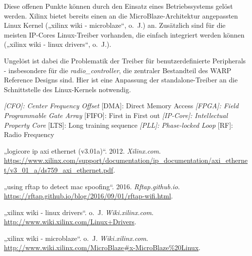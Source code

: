 \documentclass[ngerman,]{scrartcl}
\begin{document}
Diese offenen Punkte können durch den Einsatz eines Betriebssystems
gelöst werden. Xilinx bietet bereits einen an die MicroBlaze-Architektur
angepassten Linux Kernel („xilinx wiki - microblaze``, o.~J.) an.
Zusätzlich sind für die meisten IP-Cores Linux-Treiber vorhanden, die
einfach integriert werden können („xilinx wiki - linux drivers``,
o.~J.).

Ungelöst ist dabei die Problematik der Treiber für benutzerdefinierte
Peripherals - insbesondere für die \emph{radio\_controller}, die
zentraler Bestandteil des WARP Reference Designs sind. Hier ist eine
Anpassung der standalone-Treiber an die Schnittstelle des Linux-Kernels
notwendig.

\emph{{[}CFO{]}: Center Frequency Offset }{[}DMA{]}: Direct Memory
Access \emph{{[}FPGA{]}: Field Programmable Gate Array }{[}FIFO{]}:
First in First out \emph{{[}IP-Core{]}: Intellectual Property Core
}{[}LTS{]}: Long training sequence \emph{{[}PLL{]}: Phase-locked Loop
}{[}RF{]}: Radio Frequency

\hypertarget{refs}{}
\hypertarget{ref-xilinx-ethernet-core}{}
„logicore ip axi ethernet (v3.01a)``. 2012. \emph{Xilinx.com}.
\url{https://www.xilinx.com/support/documentation/ip_documentation/axi_ethernet/v3_01_a/ds759_axi_ethernet.pdf}.

\hypertarget{ref-rftap-mac}{}
„using rftap to detect mac spoofing``. 2016. \emph{Rftap.github.io}.
\url{https://rftap.github.io/blog/2016/09/01/rftap-wifi.html}.

\hypertarget{ref-xilinx-linux-drivers}{}
„xilinx wiki - linux drivers``. o.~J. \emph{Wiki.xilinx.com}.
\url{http://www.wiki.xilinx.com/Linux+Drivers}.

\hypertarget{ref-xilinx-microblaze}{}
„xilinx wiki - microblaze``. o.~J. \emph{Wiki.xilinx.com}.
\url{http://www.wiki.xilinx.com/MicroBlaze\#x-MicroBlaze\%20Linux}.
\end{document}
